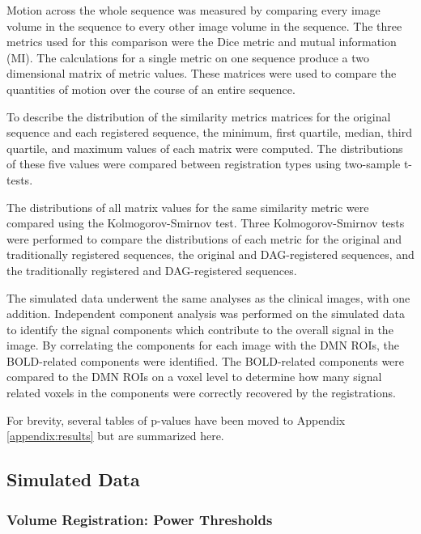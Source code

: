 Motion across the whole sequence was measured by comparing every image volume in the sequence to every other image volume in the sequence. The three metrics used for this comparison were the Dice metric and mutual information (MI). The calculations for a single metric on one sequence produce a two dimensional matrix of metric values. These matrices were used to compare the quantities of motion over the course of an entire sequence. 

To describe the distribution of the similarity metrics matrices for the original sequence and each registered sequence, the minimum, first quartile, median, third quartile, and maximum values of each matrix were computed. The distributions of these five values were compared between registration types using two-sample t-tests.

The distributions of all matrix values for the same similarity metric were compared using the Kolmogorov-Smirnov test. Three Kolmogorov-Smirnov tests were performed to compare the distributions of each metric for the original and traditionally registered sequences, the original and DAG-registered sequences, and the traditionally registered and DAG-registered sequences.

The simulated data underwent the same analyses as the clinical images, with one addition. Independent component analysis was performed on the simulated data to identify the signal components which contribute to the overall signal in the image. By correlating the components for each image with the DMN ROIs, the BOLD-related components were identified. The BOLD-related components were compared to the DMN ROIs on a voxel level to determine how many signal related voxels in the components were correctly recovered by the registrations.

For brevity, several tables of p-values have been moved to Appendix \ref{appendix:results} but are summarized here.

\subsection{Simulated Data}

\subsubsection{Volume Registration: Power Thresholds}

